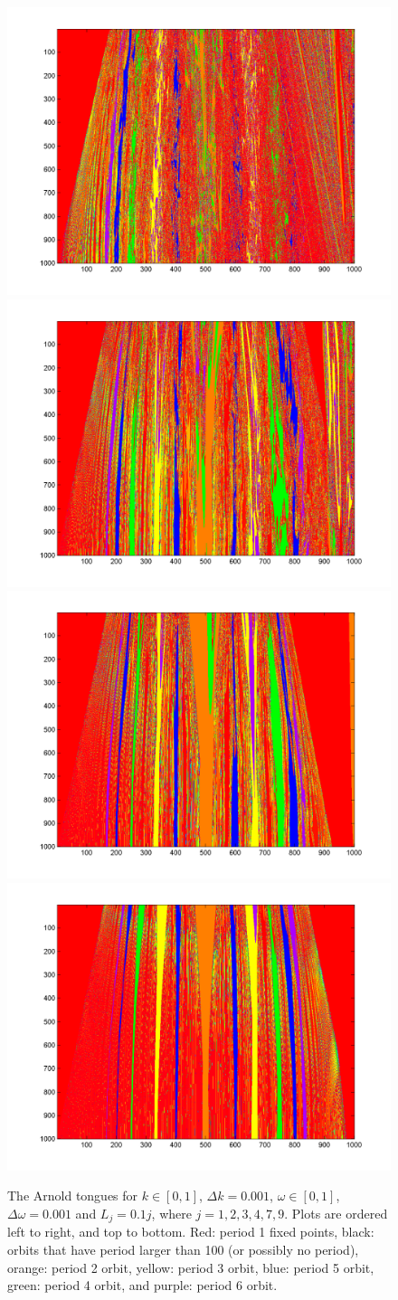 \begin{figure}[htp]
\caption[The Arnold tongues for the random circle map]{The Arnold
  tongues for $k\in [0,1]$, $\Delta k = 0.001$, $\omega \in [0,1]$,
  $\Delta \omega = 0.001$ and $L_j =0.1j$, where $j = 1, 2, 3, 4, 7,
  9$. Plots are ordered left to right, and top to bottom. Red: period 1
  fixed points, black: orbits that have period larger than 100 (or
  possibly no period), orange: period 2 orbit, yellow: period 3 orbit, blue: period 5 orbit,
green: period 4 orbit, and purple: period 6 orbit.}\label{fig:randtongues}
\centering
\includegraphics[width=.5\textwidth]{figs/tongues_1000_L_01.png}\hfill
\includegraphics[width=.5\textwidth]{figs/tongues_1000_L_02.png}\\
\includegraphics[width=.5\textwidth]{figs/tongues_1000_L_03.png}\hfill
\includegraphics[width=.5\textwidth]{figs/tongues_1000_L_04.png}\\

\end{figure}

